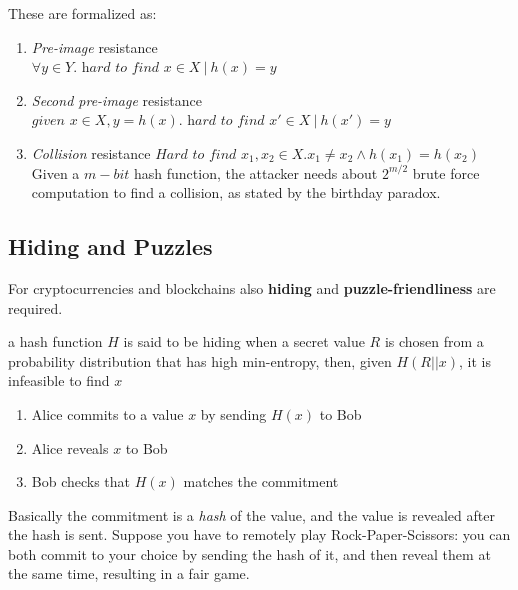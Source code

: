 {These are formalized as:\ns
\begin{enumerate}
   \item \textit{Pre-image} resistance\\
   $\forall y \in Y. \textit{ hard to find } x \in X\ |\ h(x) = y$
   \item \textit{Second pre-image} resistance
   $\textit{given } x \in X, y = h(x). \textit{ hard to find } x' \in X\ |\ h(x') = y$
   \item \textit{Collision} resistance
   $\textit{Hard to find } x_1,x_2 \in X. x_1 \neq x_2 \wedge h(x_1) = h(x_2)$
   Given a $m-bit$ hash function, the attacker needs about $2^{m/2}$ brute force computation to find a collision, as stated by the birthday paradox.
\end{enumerate}
}

\subsection{Hiding and Puzzles}
For cryptocurrencies and blockchains also \textbf{hiding} and \textbf{puzzle-friendliness} are required.
\begin{definition}[Hiding]
a hash function $H$ is said to be hiding when a secret value $R$ is chosen from
a probability distribution that has high min-entropy, then, given  $H(R || x)$, it is infeasible to find $x$
\end{definition}
\nl

 {
   \begin{enumerate}
      \item Alice commits to a value $x$ by sending $H(x)$ to Bob
      \item Alice reveals $x$ to Bob
      \item Bob checks that $H(x)$ matches the commitment
   \end{enumerate}
   Basically the commitment is a \textit{hash} of the value, and the value is revealed after the hash is sent.
   Suppose you have to remotely play Rock-Paper-Scissors: you can both commit to your choice by sending the hash of it, and then reveal them at the same time, resulting in a fair game. 
}

